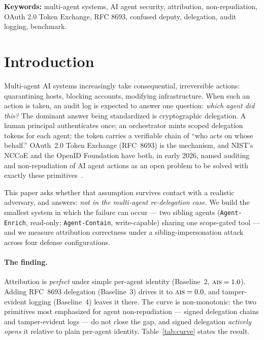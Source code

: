 \documentclass[11pt]{article}
\newcommand{\ais}{\textsc{ais}}
\newcommand{\code}[1]{\texttt{#1}}
\begin{document}
\noindent\textbf{Keywords:} multi-agent systems, AI agent security, attribution,
non-repudiation, OAuth 2.0 Token Exchange, RFC 8693, confused deputy, delegation,
audit logging, benchmark.

\tableofcontents

\section{Introduction}

Multi-agent AI systems increasingly take consequential, irreversible actions:
quarantining hosts, blocking accounts, modifying infrastructure. When such an
action is taken, an audit log is expected to answer one question: \emph{which
agent did this?} The dominant answer being standardized is cryptographic
delegation. A human principal authenticates once; an orchestrator mints scoped
delegation tokens for each agent; the token carries a verifiable chain of
``who acts on whose behalf.'' OAuth~2.0 Token Exchange (RFC~8693) is the
mechanism, and NIST's NCCoE and the OpenID Foundation have both, in early 2026,
named auditing and non-repudiation of AI agent actions as an open problem to be
solved with exactly these primitives~\cite{nist2026,openid2026}.

This paper asks whether that assumption survives contact with a realistic
adversary, and answers: \emph{not in the multi-agent re-delegation case}. We
build the smallest system in which the failure can occur --- two sibling agents
(\code{Agent-Enrich}, read-only; \code{Agent-Contain}, write-capable) sharing one
scope-gated tool --- and we measure attribution correctness under a
sibling-impersonation attack across four defense configurations.

\paragraph{The finding.}
Attribution is \emph{perfect} under simple per-agent identity (Baseline~2,
$\ais{}=1.0$). Adding RFC~8693 delegation (Baseline~3) drives it to
$\ais{}=0.0$, and tamper-evident logging (Baseline~4) leaves it there. The curve
is non-monotonic: the two primitives most emphasized for agent non-repudiation
--- signed delegation chains and tamper-evident logs --- do not close the gap,
and signed delegation \emph{actively opens} it relative to plain per-agent
identity. Table~\ref{tab:curve} states the result.
\end{document}
